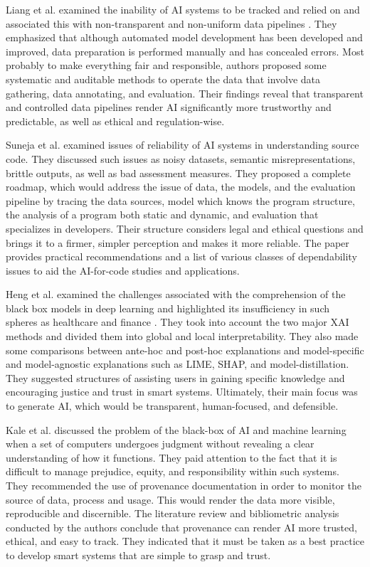\vspace{1em} 
Liang et al. examined the inability of AI systems to be tracked and relied on and associated this with non-transparent and non-uniform data pipelines \cite{Liang2022}. They emphasized that although automated model development has been developed and improved, data preparation is performed manually and has concealed errors. Most probably to make everything fair and responsible, authors proposed some systematic and auditable methods to operate the data that involve data gathering, data annotating, and evaluation. Their findings reveal that transparent and controlled data pipelines render AI significantly more trustworthy and predictable, as well as ethical and regulation-wise.

\vspace{1em} 
Suneja et al. examined issues of reliability of AI systems in understanding source code\cite{Suneja2021}. They discussed such issues as noisy datasets, semantic misrepresentations, brittle outputs, as well as bad assessment measures. They proposed a complete roadmap, which would address the issue of data, the models, and the evaluation pipeline by tracing the data sources, model which knows the program structure, the analysis of a program both static and dynamic, and evaluation that specializes in developers. Their structure considers legal and ethical questions and brings it to a firmer, simpler perception and makes it more reliable. The paper provides practical recommendations and a list of various classes of dependability issues to aid the AI-for-code studies and applications.

\vspace{1em} 

Heng et al. examined the challenges associated with the comprehension of the black box models in deep learning and highlighted its insufficiency in such spheres as healthcare and finance \cite{Hassija2024}. They took into account the two major XAI methods and divided them into global and local interpretability. They also made some comparisons between ante-hoc and post-hoc explanations and model-specific and model-agnostic explanations such as LIME, SHAP, and model-distillation. They suggested structures of assisting users in gaining specific knowledge and encouraging justice and trust in smart systems. Ultimately, their main focus was to generate AI, which would be transparent, human-focused, and defensible.

\vspace{1em} 
Kale et al. discussed the problem of the black-box of AI and machine learning when a set of computers undergoes judgment without revealing a clear understanding of how it functions\cite{Kale2023}. They paid attention to the fact that it is difficult to manage prejudice, equity, and responsibility within such systems. They recommended the use of provenance documentation in order to monitor the source of data, process and usage. This would render the data more visible, reproducible and discernible. The literature review and bibliometric analysis conducted by the authors conclude that provenance can render AI more trusted, ethical, and easy to track. They indicated that it must be taken as a best practice to develop smart systems that are simple to grasp and trust.

